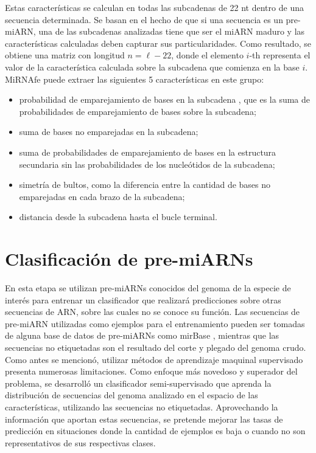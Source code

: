 Estas características se calculan en todas las subcadenas de 22 nt dentro de una secuencia determinada. Se basan en el hecho de que si una secuencia es un
pre-miARN, una de las subcadenas analizadas tiene que ser el miARN maduro y las características calculadas deben capturar sus particularidades. Como
resultado, se obtiene una matriz con longitud $ n = \ell - 22 $, donde el elemento $i$-th representa el valor de la característica calculada sobre la
subcadena que comienza en la base $i$. MiRNAfe puede extraer las siguientes 5 características en este grupo:
\begin{itemize}
	\item probabilidad de emparejamiento de bases en la subcadena \citep{lim2003}, que es la suma de probabilidades de emparejamiento de bases sobre la subcadena;
	\item suma de bases no emparejadas en la subcadena;
	\item suma de probabilidades de emparejamiento de bases en la estructura secundaria sin las probabilidades de los nucleótidos de la subcadena;
	\item simetría de bultos, como la diferencia entre la cantidad de bases no emparejadas en cada brazo de la subcadena;
	\item distancia desde la subcadena hasta el bucle terminal.
\end{itemize}

\section{Clasificación de pre-miARNs}

En esta etapa se utilizan pre-miARNs conocidos del genoma de la especie de interés para entrenar un clasificador que realizará predicciones sobre otras
secuencias de ARN, sobre las cuales no se  conoce su función. Las secuencias de pre-miARN utilizadas como ejemplos para el entrenamiento pueden ser tomadas de
alguna base de datos de pre-miARNs como  mirBase \citep{kozomara2014mirbase}, mientras que las secuencias no etiquetadas son el resultado del corte y plegado
del genoma crudo. Como antes se mencionó, utilizar métodos de aprendizaje maquinal supervisado presenta numerosas limitaciones. Como enfoque más novedoso y
superador del problema, se desarrolló un clasificador semi-supervisado que aprenda la distribución de secuencias del genoma analizado en el espacio de las
características, utilizando las secuencias no etiquetadas. Aprovechando la información que aportan estas secuencias, se pretende mejorar las tasas de predicción
en situaciones donde la cantidad de ejemplos es baja o cuando no son representativos de sus respectivas clases.

